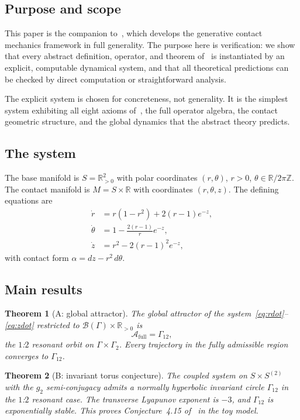 \documentclass[reqno]{amsart}
\numberwithin{equation}{section}
\theoremstyle{plain}
\newtheorem{theorem}{Theorem}[section]
\theoremstyle{definition}
\theoremstyle{remark}
\newcommand{\R}{\mathbb{R}}
\newcommand{\Orb}{\Gamma}
\newcommand{\cB}{\mathcal{B}}
\begin{document}
\subsection{Purpose and scope}

This paper is the companion to~\cite{Paper1}, which develops the
generative contact mechanics framework in full generality. The purpose
here is verification: we show that every abstract definition, operator,
and theorem of~\cite{Paper1} is instantiated by an explicit, computable
dynamical system, and that all theoretical predictions can be checked
by direct computation or straightforward analysis.

The explicit system is chosen for concreteness, not generality.
It is the simplest system exhibiting all eight axioms of~\cite{Paper1},
the full operator algebra, the contact geometric structure, and the
global dynamics that the abstract theory predicts.

\subsection{The system}

The base manifold is $S=\R^2_{>0}$ with polar coordinates $(r,\theta)$,
$r>0$, $\theta\in\R/2\pi\mathbb{Z}$. The contact manifold is
$M=S\times\R$ with coordinates $(r,\theta,z)$. The defining equations are
\begin{align}
  \dot r &= r(1-r^2) + 2(r-1)e^{-z},\label{eq:rdot}\\
  \dot\theta &= 1 - \frac{2(r-1)}{r}e^{-z},\label{eq:thetadot}\\
  \dot z &= r^2 - 2(r-1)^2 e^{-z},\label{eq:zdot}
\end{align}
with contact form $\alpha=dz-r^2\,d\theta$.

\subsection{Main results}

\begin{theorem}[A: global attractor]\label{thm:A}
The global attractor of the system~\eqref{eq:rdot}--\eqref{eq:zdot}
restricted to $\cB(\Orb)\times\R_{>0}$ is
\[
  \mathcal{A}_{\mathrm{full}} = \Orb_{12},
\]
the $1$:$2$ resonant orbit on $\Orb\times\Orb_2$. Every trajectory
in the fully admissible region converges to $\Orb_{12}$.
\end{theorem}

\begin{theorem}[B: invariant torus conjecture]\label{thm:B}
The coupled system on $S\times S^{(2)}$ with the $g_2$ semi-conjugacy
admits a normally hyperbolic invariant circle $\Orb_{12}$ in the
$1$:$2$ resonant case. The transverse Lyapunov exponent is $-3$,
and $\Orb_{12}$ is exponentially stable. This proves
Conjecture~4.15 of~\cite{Paper1} in the toy model.
\end{theorem}
\end{document}
